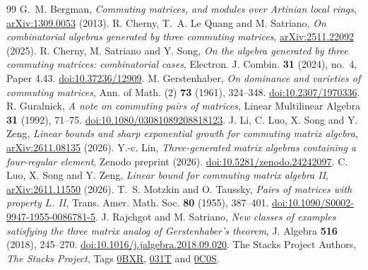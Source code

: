 \documentclass[11pt,reqno]{amsart}
\theoremstyle{definition}
\begin{document}
\begin{thebibliography}{99}
G.~M. Bergman, \emph{Commuting matrices, and modules over Artinian local
rings}, \href{https://arxiv.org/abs/1309.0053}{arXiv:1309.0053} (2013).
R. Cherny, T.~A. Le Quang and M. Satriano, \emph{On combinatorial algebras
generated by three commuting matrices},
\href{https://arxiv.org/abs/2511.22092}{arXiv:2511.22092} (2025).
R. Cherny, M. Satriano and Y. Song, \emph{On the algebra generated by three
commuting matrices: combinatorial cases}, Electron. J. Combin.
\textbf{31} (2024), no.~4, Paper 4.43.
\href{https://doi.org/10.37236/12909}{doi:10.37236/12909}.
M. Gerstenhaber, \emph{On dominance and varieties of commuting matrices},
Ann. of Math. (2) \textbf{73} (1961), 324--348.
\href{https://doi.org/10.2307/1970336}{doi:10.2307/1970336}.
R. Guralnick, \emph{A note on commuting pairs of matrices}, Linear
Multilinear Algebra \textbf{31} (1992), 71--75.
\href{https://doi.org/10.1080/03081089208818123}{doi:10.1080/03081089208818123}.
J. Li, C. Luo, X. Song and Y. Zeng, \emph{Linear bounds and sharp
exponential growth for commuting matrix algebra},
\href{https://arxiv.org/abs/2611.08135}{arXiv:2611.08135} (2026).
Y.-c. Lin, \emph{Three-generated matrix algebras containing a four-regular
element}, Zenodo preprint (2026).
\href{https://doi.org/10.5281/zenodo.24242097}{doi:10.5281/zenodo.24242097}.
C. Luo, X. Song and Y. Zeng, \emph{Linear bound for commuting matrix algebra
II}, \href{https://arxiv.org/abs/2611.11550}{arXiv:2611.11550} (2026).
T.~S. Motzkin and O. Taussky, \emph{Pairs of matrices with property \(L\).
II}, Trans. Amer. Math. Soc. \textbf{80} (1955), 387--401.
\href{https://doi.org/10.1090/S0002-9947-1955-0086781-5}{doi:10.1090/S0002-9947-1955-0086781-5}.
J. Rajchgot and M. Satriano, \emph{New classes of examples satisfying the
three matrix analog of Gerstenhaber's theorem}, J. Algebra \textbf{516}
(2018), 245--270.
\href{https://doi.org/10.1016/j.jalgebra.2018.09.020}{doi:10.1016/j.jalgebra.2018.09.020}.
The Stacks Project Authors, \emph{The Stacks Project},
Tags \href{https://stacks.math.columbia.edu/tag/0BXR}{0BXR},
\href{https://stacks.math.columbia.edu/tag/031T}{031T} and
\href{https://stacks.math.columbia.edu/tag/0C0S}{0C0S}.
\end{thebibliography}
\end{document}
